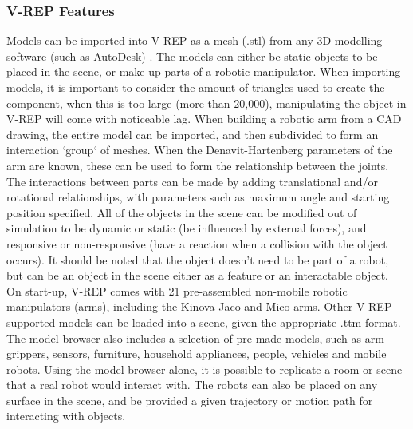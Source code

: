 \documentclass[12pt,openany,a4paper]{book}
\begin{document}
\subsubsection{V-REP Features}
Models can be imported into V-REP as a mesh (.stl) from any 3D modelling software (such as AutoDesk) \cite{modelVREP}. The models can either be static objects to be placed in the scene, or make up parts of a robotic manipulator. When importing models, it is important to consider the amount of triangles used to create the component, when this is too large (more than 20,000), manipulating the object in V-REP will come with noticeable lag. When building a robotic arm from a CAD drawing, the entire model can be imported, and then subdivided to form an interaction `group` of meshes. When the Denavit-Hartenberg parameters of the arm are known, these can be used to form the relationship between the joints. The interactions between parts can be made by adding translational and/or rotational relationships, with parameters such as maximum angle and starting position specified. All of the objects in the scene can be modified out of simulation to be dynamic or static (be influenced by external forces), and responsive or non-responsive (have a reaction when a collision with the object occurs). It should be noted that the object doesn't need to be part of a robot, but can be an object in the scene either as a feature or an interactable object.\\


On start-up, V-REP comes with 21 pre-assembled non-mobile robotic manipulators (arms), including the Kinova Jaco and Mico arms. Other V-REP supported models can be loaded into a scene, given the appropriate .ttm format. The model browser also includes a selection of pre-made models, such as arm grippers, sensors, furniture, household appliances, people, vehicles and mobile robots. Using the model browser alone, it is possible to replicate a room or scene that a real robot would interact with. The robots can also be placed on any surface in the scene, and be provided a given trajectory or motion path for interacting with objects.\\
\end{document}
